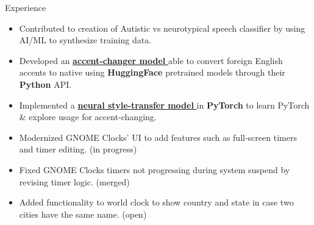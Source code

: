 \documentclass{resume} %
\begin{document}
\begin{workSection}{Experience}
	
	\experienceItem[
	company=Texas Instruments,
	location=Dallas{,} TX,
	position=Upcoming Information Technology Intern,
	duration= May - August 2024,
	]
	
	\experienceItem[
	company=UTEP,
	location=El Paso{,} TX,
	position=Undergraduate Research Assistant,
	duration=January 2024 - present,
	]
	\begin{itemize}
		\vspace{-0.5em}
		\itemsep -6pt {}
		\item Contributed to creation of Autistic vs neurotypical speech classifier by using AI/ML to synthesize training data.
		 \item Developed an \href{https://github.com/AshkanArabim/accent-change-paper-implementation}{\textbf{accent-changer model} \faExternalLink} able to convert foreign English accents to native using \textbf{HuggingFace} pretrained models through their \textbf{Python} API.
		\item Implemented a \href{https://github.com/AshkanArabim/neural-style-transfer}{\textbf{neural style-transfer model} \faExternalLink} in \textbf{PyTorch} to learn PyTorch \& explore usage for accent-changing.
	\end{itemize}
	
	
	\experienceItem[
	company=GNOME Foundation,
	location=Remote,
	position=Open-Source Contributor,
	duration=December 2023 {-} present
	]
	\begin{itemize}
		\vspace{-0.5em}
		\itemsep -6pt {}
		\item Modernized GNOME Clocks' UI to add features such as full-screen timers and timer editing. (in progress)
		\item Fixed GNOME Clocks timers not progressing during system suspend by revising timer logic. (merged)
		\item Added functionality to world clock to show country and state in case two cities have the same name. (open)
	\end{itemize}


\end{workSection}
\end{document}
